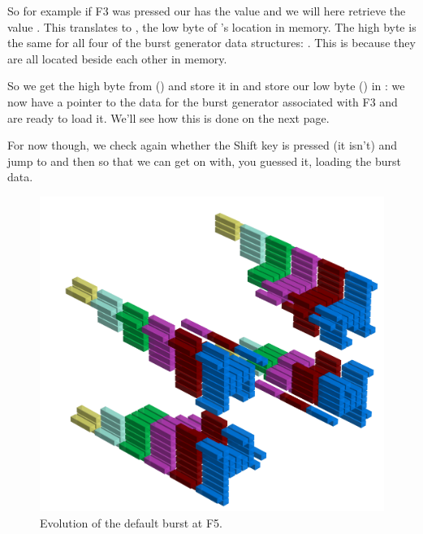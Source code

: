 So for example if F3 was pressed our  has the value  and we will here retrieve the value . This
translates to , the low byte of 's location in memory. The high byte is the same for all four of the burst generator
data structures: . This is because they are all located beside each other in memory.

 So we get the high byte from  ()
and store it in  and store our low byte () in : we now have a pointer to the data for the burst generator
associated with F3 and are ready to load it. We'll see how this is done on the next page. 

For now though, we check again whether the Shift key is pressed (it isn't) and jump to  and then  so that we
can get on with, you guessed it, loading the burst data.

\clearpage

\clearpage
\begin{figure}[H]
    \centering
    \begin{adjustbox}{width=12cm,center}
      \includegraphics[width=12cm]{src/patterns/bursts/pattern2-45.png}%
    \end{adjustbox}
\caption{Evolution of the default burst at F5.}
\end{figure}
\clearpage

